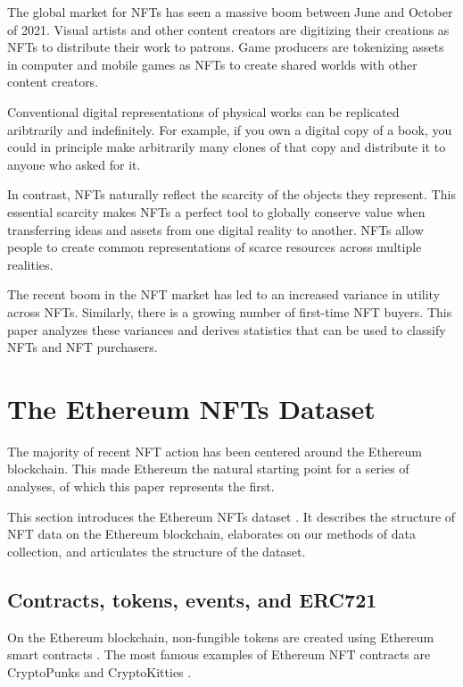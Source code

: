 \documentclass{article}
\begin{document}
The global market for NFTs has seen a massive boom between June and October of 2021. Visual artists and other content creators are digitizing their creations as NFTs to distribute their work to patrons. Game producers are tokenizing assets in computer and mobile games as NFTs to create shared worlds with other content creators.

Conventional digital representations of physical works can be replicated aribtrarily and indefinitely. For example, if you own a digital copy of a book, you could in principle make arbitrarily many clones of that copy and distribute it to anyone who asked for it.

In contrast, NFTs naturally reflect the scarcity of the objects they represent. This essential scarcity makes NFTs a perfect tool to globally conserve value when transferring ideas and assets from one digital reality to another. NFTs allow people to create common representations of scarce resources across multiple realities.

The recent boom in the NFT market \cite{reuters-nft-surge} has led to an increased variance in utility across NFTs. Similarly, there is a growing number of first-time NFT buyers. This paper analyzes these variances and derives statistics that can be used to classify NFTs and NFT purchasers.

\section{The Ethereum NFTs Dataset}

The majority of recent NFT action has been centered around the Ethereum blockchain. This made Ethereum the natural starting point for a series of analyses, of which this paper represents the first.

This section introduces the Ethereum NFTs dataset \cite{ethereum-nfts}. It describes the structure of NFT data on the Ethereum blockchain, elaborates on our methods of data collection, and articulates the structure of the dataset.

\subsection{Contracts, tokens, events, and ERC721}

On the Ethereum blockchain, non-fungible tokens are created using Ethereum smart contracts \cite{ethereum-smart-contracts}. The most famous examples of Ethereum NFT contracts are CryptoPunks \cite{cryptopunks} and CryptoKitties \cite{cryptokitties}.
\end{document}
